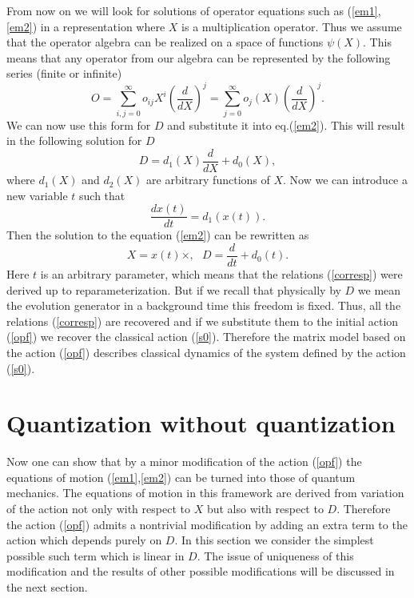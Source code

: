 \documentclass[a4paper,11pt]{article}
\begin{document}
From now on we will look for solutions of operator equations such
as (\ref{em1},\ref{em2}) in a representation where $X$ is a
multiplication operator. Thus we assume that the operator algebra
can be realized on a space of functions $\psi(X)$. This means that
any operator from our algebra can be represented by the following
series (finite or infinite)
\begin{equation}
O=\sum\limits_{i,j=0}^{\infty}o_{ij}X^i \left(
\frac{d}{dX}\right)^j=
\sum\limits_{j=0}^{\infty}o_{j}(X)\left(\frac{d}{dX}\right)^j.
\label{patt}
\end{equation}
We can now use this form for $D$ and substitute it into
eq.(\ref{em2}). This will result in the following solution for $D$
\begin{equation}
D=d_1(X)\frac{d}{dX}+d_0(X), \label{solfod}
\end{equation}
where $d_1(X)$ and $d_2(X)$ are arbitrary functions of $X$. Now we
can  introduce a new variable $t$ such that
\begin{equation}
\frac{dx(t)}{dt}=d_1(x(t)). \label{proof5}
\end{equation}
Then  the solution to the equation (\ref{em2}) can be rewritten as
\begin{equation}
X=x(t)\times, \ \ \ D= \frac{d}{dt} +d_0(t). \label{prooff}
\end{equation}
Here $t$ is an arbitrary parameter, which means that the relations
(\ref{corresp}) were derived up to reparameterization. But if we
recall that physically by $D$ we mean the evolution generator in a
background time this freedom is fixed. Thus, all the relations
(\ref{corresp}) are recovered  and if we substitute them to the
initial action (\ref{opf}) we recover the classical action
(\ref{s0}). Therefore the matrix model based on the action
(\ref{opf}) describes classical dynamics of the system defined by
the action (\ref{s0}).

\section{Quantization without quantization} \label{sec3}

Now one can show that by a minor modification of the action
(\ref{opf}) the equations of motion (\ref{em1},\ref{em2}) can be
turned into those of quantum mechanics. The equations of motion in
this framework  are derived from variation of the action not only
with respect to $X$ but also with respect to $D$. Therefore the
action (\ref{opf}) admits a nontrivial modification by adding an
extra term to the action which depends purely on $D$. In this
section we consider the simplest possible such term which is
linear in $D$. The issue of uniqueness of this modification and
the results of other possible modifications will be discussed in
the next section.
\end{document}
